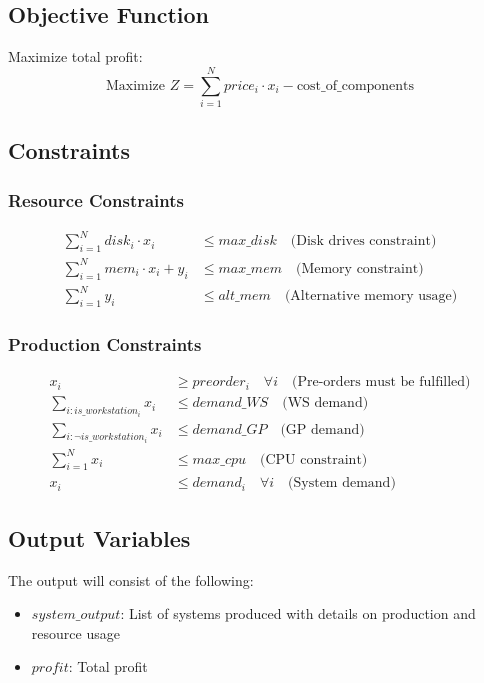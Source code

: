 \documentclass{article}
\begin{document}
\subsection*{Objective Function}
Maximize total profit:
\[
\text{Maximize } Z = \sum_{i=1}^{N} price_i \cdot x_i - \text{cost\_of\_components}
\]

\subsection*{Constraints}

\subsubsection*{Resource Constraints}
\begin{align}
\sum_{i=1}^{N} disk_i \cdot x_i & \leq max\_disk \quad \text{(Disk drives constraint)} \\
\sum_{i=1}^{N} mem_i \cdot x_i + y_i & \leq max\_mem \quad \text{(Memory constraint)} \\
\sum_{i=1}^{N} y_i & \leq alt\_mem \quad \text{(Alternative memory usage)}
\end{align}

\subsubsection*{Production Constraints}
\begin{align}
x_i & \geq preorder_i \quad \forall i \quad \text{(Pre-orders must be fulfilled)} \\
\sum_{i: is\_workstation_i} x_i & \leq demand\_WS \quad \text{(WS demand)} \\
\sum_{i: \neg is\_workstation_i} x_i & \leq demand\_GP \quad \text{(GP demand)} \\
\sum_{i=1}^{N} x_i & \leq max\_cpu \quad \text{(CPU constraint)} \\
x_i & \leq demand_i \quad \forall i \quad \text{(System demand)} 
\end{align}

\subsection*{Output Variables}
The output will consist of the following:
\begin{itemize}
    \item $system\_output$: List of systems produced with details on production and resource usage
    \item $profit$: Total profit
\end{itemize}
\end{document}
